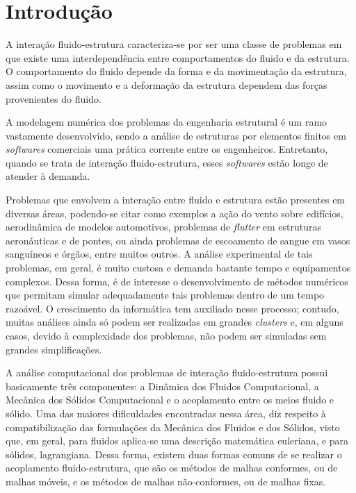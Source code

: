 \chapter[Introdução]{Introdução}\label{capitulo:introducao}

A interação fluido-estrutura caracteriza-se por ser uma classe de problemas em que existe uma interdependência entre comportamentos do fluido e da estrutura. O comportamento do fluido depende da forma e da movimentação da estrutura, assim como o movimento e a deformação da estrutura dependem das forças provenientes do fluido.

A modelagem numérica dos problemas da engenharia estrutural é um ramo vastamente desenvolvido, sendo a análise de estruturas por elementos finitos em \textit{softwares} comerciais uma prática corrente entre os engenheiros. Entretanto, quando se trata de interação fluido-estrutura, esses \textit{softwares} estão longe de atender à demanda.

Problemas que envolvem a interação entre fluido e estrutura estão presentes em diversas áreas, podendo-se citar como exemplos a ação do vento sobre edifícios, aerodinâmica de modelos automotivos, problemas de \textit{flutter} em estruturas aeronáuticas e de pontes, ou ainda problemas de escoamento de sangue em vasos sanguíneos e órgãos, entre muitos outros. A análise experimental de tais problemas, em geral, é muito custosa e demanda bastante tempo e equipamentos complexos. Dessa forma, é de interesse o desenvolvimento de métodos numéricos que permitam simular adequadamente tais problemas dentro de um tempo razoável. O crescimento da informática tem auxiliado nesse processo; contudo, muitas análises ainda só podem ser realizadas em grandes \textit{clusters} e, em alguns casos, devido à complexidade dos problemas, não podem ser simuladas sem grandes simplificações.

A análise computacional dos problemas de interação fluido-estrutura possui basicamente três componentes: a Dinâmica dos Fluidos Computacional, a Mecânica dos Sólidos Computacional e o acoplamento entre os meios fluido e sólido. Uma das maiores dificuldades encontradas nessa área, diz respeito à compatibilização das formulações da Mecânica dos Fluidos e dos Sólidos, visto que, em geral, para fluidos aplica-se uma descrição matemática euleriana, e para sólidos, lagrangiana. Dessa forma, existem duas formas comuns de se realizar o acoplamento fluido-estrutura, que são os métodos de malhas conformes, ou de malhas móveis, e os métodos de malhas não-conformes, ou de malhas fixas. 

